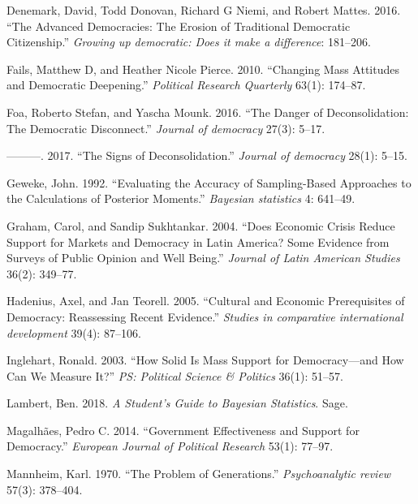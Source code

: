 \documentclass[12pt,english,a4paper,oneside]{article}
\newlength{\cslhangindent}
\newlength{\cslentryspacingunit} %
\newenvironment{CSLReferences}[2] %
 {%
  \setlength{\parindent}{0pt}
  \ifodd #1
  \let\oldpar\par
  \def\par{\hangindent=\cslhangindent\oldpar}
  \fi
  \setlength{\parskip}{#2\cslentryspacingunit}
 }%
 {}
\theoremstyle{definition}
\theoremstyle{definition}
\theoremstyle{definition}
\theoremstyle{definition}
\theoremstyle{remark}
\begin{document}
\begin{CSLReferences}{1}{0}
\leavevmode{}%
Denemark, David, Todd Donovan, Richard G Niemi, and Robert Mattes. 2016. {``The Advanced Democracies: The Erosion of Traditional Democratic Citizenship.''} \emph{Growing up democratic: Does it make a difference}: 181--206.

\leavevmode{}%
Fails, Matthew D, and Heather Nicole Pierce. 2010. {``Changing Mass Attitudes and Democratic Deepening.''} \emph{Political Research Quarterly} 63(1): 174--87.

\leavevmode{}%
Foa, Roberto Stefan, and Yascha Mounk. 2016. {``The Danger of Deconsolidation: The Democratic Disconnect.''} \emph{Journal of democracy} 27(3): 5--17.

\leavevmode{}%
---------. 2017. {``The Signs of Deconsolidation.''} \emph{Journal of democracy} 28(1): 5--15.

\leavevmode{}%
Geweke, John. 1992. {``Evaluating the Accuracy of Sampling-Based Approaches to the Calculations of Posterior Moments.''} \emph{Bayesian statistics} 4: 641--49.

\leavevmode{}%
Graham, Carol, and Sandip Sukhtankar. 2004. {``Does Economic Crisis Reduce Support for Markets and Democracy in Latin America? Some Evidence from Surveys of Public Opinion and Well Being.''} \emph{Journal of Latin American Studies} 36(2): 349--77.

\leavevmode{}%
Hadenius, Axel, and Jan Teorell. 2005. {``Cultural and Economic Prerequisites of Democracy: Reassessing Recent Evidence.''} \emph{Studies in comparative international development} 39(4): 87--106.

\leavevmode{}%
Inglehart, Ronald. 2003. {``How Solid Is Mass Support for Democracy---and How Can We Measure It?''} \emph{PS: Political Science \& Politics} 36(1): 51--57.

\leavevmode{}%
Lambert, Ben. 2018. \emph{A Student's Guide to Bayesian Statistics}. Sage.

\leavevmode{}%
Magalhães, Pedro C. 2014. {``Government Effectiveness and Support for Democracy.''} \emph{European Journal of Political Research} 53(1): 77--97.

\leavevmode{}%
Mannheim, Karl. 1970. {``The Problem of Generations.''} \emph{Psychoanalytic review} 57(3): 378--404.


\end{CSLReferences}
\end{document}
